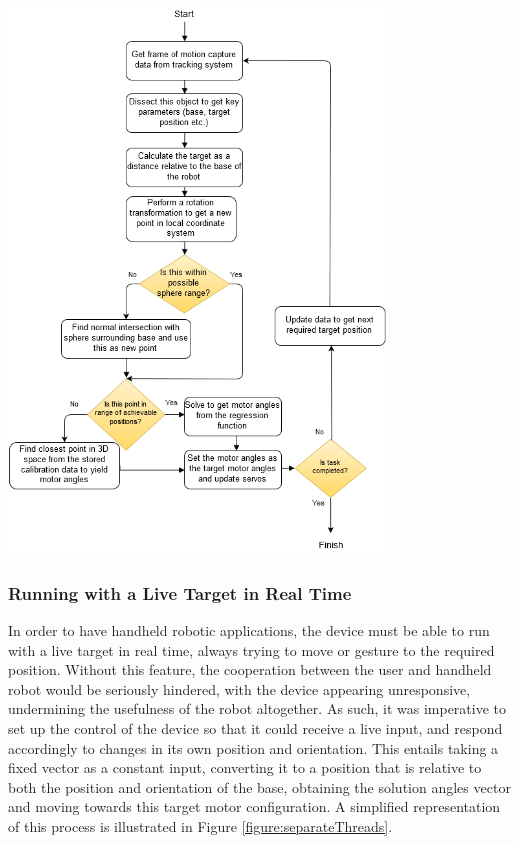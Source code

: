 \documentclass[11pt]{article}
\begin{document}
\begin{center}
\includegraphics[width=0.75\textwidth]{images/algorithmFlowDiagram.png}
\label{figure:getSolution}
\end{center}




\subsubsection{Running with a Live Target in Real Time}
In order to have handheld robotic applications, the device must be able to run with a live target in real time, always trying to move or gesture to the required position. Without this feature, the cooperation between the user and handheld robot would be seriously hindered, with the device appearing unresponsive, undermining the usefulness of the robot altogether. As such, it was imperative to set up the control of the device so that it could receive a live input, and respond accordingly to changes in its own position and orientation. This entails taking a fixed vector as a constant input, converting it to a position that is relative to both the position and orientation of the base, obtaining the solution angles vector and moving towards this target motor configuration. A simplified representation of this process is illustrated in Figure \ref{figure:separateThreads}.
\end{document}
